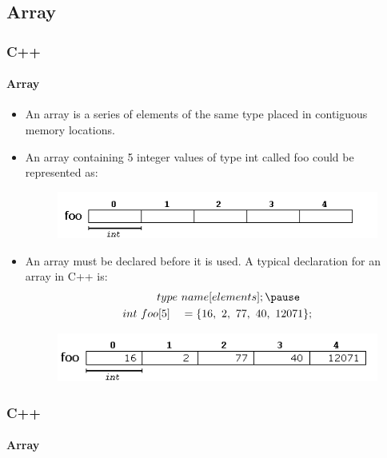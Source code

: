 \documentclass[hyperref={pdfpagelabels=true}]{beamer}
\begin{document}
\subsection{Array}
\begin{frame}
\frametitle{C++}
\framesubtitle{Array}
\begin{itemize}
\item An array is a series of elements of the same type placed in contiguous memory locations.
\item An array containing 5 integer values of type int called foo could be represented as:
\begin{figure}[!tbp]
\centering
\includegraphics[scale = 0.5]{figs/Selection_020.png}
\end{figure}
\item An array must be declared before it is used. A typical declaration for an array in C++ is:
\pause
\begin{align*}
type \ &name[elements]; \pause \\
int \  foo[5] \quad &= \{16,\ 2,\ 77,\ 40,\ 12071 \};
\end{align*}

\begin{figure}[!tbp]
\centering
\includegraphics[scale = 0.5]{figs/Selection_021.png}
\end{figure}
\end{itemize}
\end{frame}

\begin{frame}
\frametitle{C++}
\framesubtitle{Array}
\begin{tcolorbox}[title= ,width=11.85 cm]

\end{tcolorbox}
\end{frame}
\end{document}
